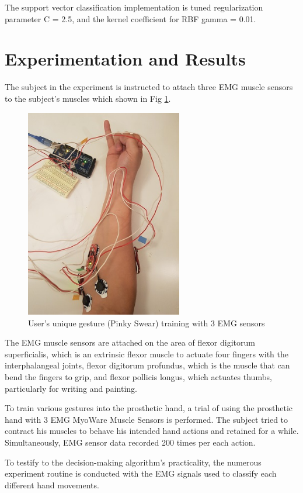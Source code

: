 \documentclass[conference]{IEEEtran}
\begin{document}
The support vector classification implementation is tuned regularization parameter C = 2.5, and the kernel coefficient for RBF gamma = 0.01.




\section{Experimentation and Results}
The subject in the experiment is instructed to attach three EMG muscle sensors to the subject's muscles which shown in Fig \ref{pic}.

\begin{figure}[h]
  \centering
  \includegraphics[width=2.7in]{am.jpg}
  \caption{User's unique gesture (Pinky Swear) training with 3 EMG sensors}
  \label{pic}
\end{figure}

The EMG muscle sensors are attached on the area of flexor digitorum superficialis, which is an extrinsic flexor muscle to actuate four fingers with the interphalangeal joints, flexor digitorum profundus, which is the muscle that can bend the fingers to grip, and flexor pollicis longus, which actuates thumbs, particularly for writing and painting.

To train various gestures into the prosthetic hand, a trial of using the prosthetic hand with 3 EMG MyoWare Muscle Sensors is performed. The subject tried to contract his muscles to behave his intended hand actions and retained for a while. Simultaneously, EMG sensor data recorded 200 times per each action.

To testify to the decision-making algorithm's practicality, the numerous experiment routine is conducted with the EMG signals used to classify each different hand movements.
\end{document}
